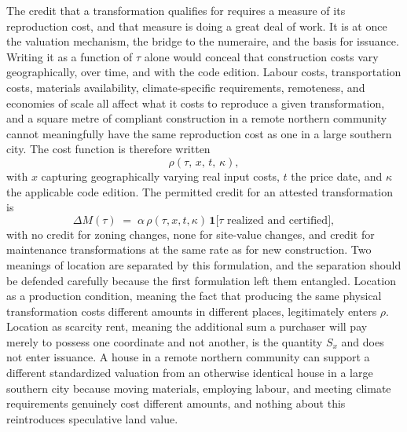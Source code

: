 \documentclass[11pt]{article}
\theoremstyle{definition}
\begin{document}
The credit that a transformation qualifies for requires a measure of its reproduction cost, and that measure is doing a great deal of work. It is at once the valuation mechanism, the bridge to the numeraire, and the basis for issuance. Writing it as a function of $\tau$ alone would conceal that construction costs vary geographically, over time, and with the code edition. Labour costs, transportation costs, materials availability, climate-specific requirements, remoteness, and economies of scale all affect what it costs to reproduce a given transformation, and a square metre of compliant construction in a remote northern community cannot meaningfully have the same reproduction cost as one in a large southern city. The cost function is therefore written
\begin{equation}
\rho(\tau,\,x,\,t,\,\kappa),
\label{eq:rho}
\end{equation}
with $x$ capturing geographically varying real input costs, $t$ the price date, and $\kappa$ the applicable code edition. The permitted credit for an attested transformation is
\begin{equation}
\Delta M(\tau) \;=\; \alpha\,\rho(\tau,x,t,\kappa)\,\mathbf{1}\bigl[\tau \text{ realized and certified}\bigr],
\label{eq:issue}
\end{equation}
with no credit for zoning changes, none for site-value changes, and credit for maintenance transformations at the same rate as for new construction. Two meanings of location are separated by this formulation, and the separation should be defended carefully because the first formulation left them entangled. Location as a production condition, meaning the fact that producing the same physical transformation costs different amounts in different places, legitimately enters $\rho$. Location as scarcity rent, meaning the additional sum a purchaser will pay merely to possess one coordinate and not another, is the quantity $S_x$ and does not enter issuance. A house in a remote northern community can support a different standardized valuation from an otherwise identical house in a large southern city because moving materials, employing labour, and meeting climate requirements genuinely cost different amounts, and nothing about this reintroduces speculative land value.
\end{document}

